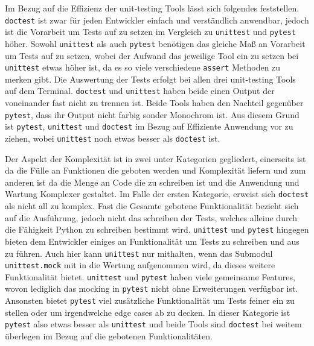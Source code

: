 Im Bezug auf die Effizienz der unit-testing Tools lässt sich folgendes
feststellen. \lstinline{doctest} ist zwar für jeden Entwickler einfach und
verständlich anwendbar, jedoch ist die Vorarbeit um Tests auf zu setzen im
Vergleich zu \lstinline{unittest} und \lstinline{pytest} höher. Sowohl
\lstinline{unittest} als auch \lstinline{pytest} benötigen das gleiche Maß an
Vorarbeit um Tests auf zu setzen, wobei der Aufwand das jeweilige Tool ein zu
setzen bei \lstinline{unittest} etwas höher ist, da es so viele verschiedene
\lstinline{assert} Methoden zu merken gibt. Die Auswertung der Tests erfolgt
bei allen drei unit-testing Tools auf dem Terminal. \lstinline{doctest} und
\lstinline{unittest} haben beide einen Output der voneinander fast nicht zu
trennen ist. Beide Tools haben den Nachteil gegenüber \lstinline{pytest}, dass
ihr Output nicht farbig sonder Monochrom ist.  Aus diesem Grund ist 
\lstinline{pytest}, \lstinline{unittest} und \lstinline{doctest} im Bezug auf
Effiziente Anwendung vor zu ziehen, wobei \lstinline{unittest} noch etwas 
besser als \lstinline{doctest} ist.
\newline

Der Aspekt der Komplexität ist in zwei unter Kategorien gegliedert, einerseits
ist da die Fülle an Funktionen die geboten werden und Komplexität liefern und
zum anderen ist da die Menge an Code die zu schreiben ist und die Anwendung und
Wartung Komplexer gestaltet. Im Falle der ersten Kategorie, erweist sich
\lstinline{doctest} als nicht all zu komplex. Fast die Gesamte gebotene
Funktionalität bezieht sich auf die Ausführung, jedoch nicht das schreiben der
Tests, welches alleine durch die Fähigkeit Python zu schreiben bestimmt wird.
\lstinline{unittest} und \lstinline{pytest} hingegen bieten dem Entwickler
einiges an Funktionalität um Tests zu schreiben und aus zu führen. Auch hier
kann \lstinline{unittest} nur mithalten, wenn das Submodul
\lstinline{unittest.mock} mit in die Wertung aufgenommen wird, da dieses
weitere Funktionalität bietet. \lstinline{unittest} und \lstinline{pytest}
haben viele gemeinsame Features, wovon lediglich das \gls{mock}ing in
\lstinline{pytest} nicht ohne Erweiterungen verfügbar ist. Ansonsten bietet
\lstinline{pytest} viel zusätzliche Funktionalität um Tests feiner ein zu
stellen oder um irgendwelche edge cases ab zu decken. In dieser Kategorie ist
\lstinline{pytest} also etwas besser als \lstinline{unittest} und beide Tools
sind \lstinline{doctest} bei weitem überlegen im Bezug auf die gebotenen
Funktionalitäten.

